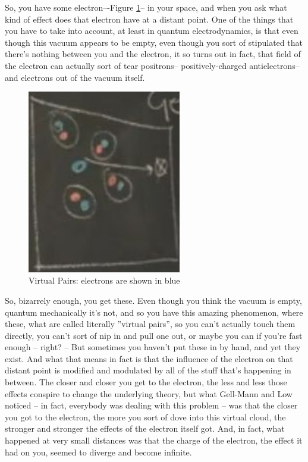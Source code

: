 \documentclass[]{article}
\begin{document}
So, you have some electron–-Figure \ref{fig:Virtual_Pairs}--
in your space, and when you ask what kind of effect does that electron have at a distant point.
One of the things that you have to take into account, at least in quantum electrodynamics, is that even though this vacuum appears to be empty, even though you sort of stipulated that there's nothing between you and the electron, it so turns out in fact, that field of the electron can actually sort of tear
positrons--
positively-charged antielectrons--and electrons out of the vacuum itself.
\begin{figure}[H]
	\begin{center}
		\caption{Virtual Pairs: electrons are shown in blue}\label{fig:Virtual_Pairs}
		\includegraphics[width=0.6\textwidth]{Virtual_Pairs}
	\end{center}
\end{figure}
So, bizarrely enough,
you get these.
Even though you think
the vacuum is empty,
quantum mechanically it's not,
and so you have
this amazing phenomenon,
where these, what are called
literally ''virtual pairs'',
so you can't actually touch them directly,
you can't sort of nip in
and pull one out,
or maybe you can
if you're fast enough – right? –
But sometimes you haven't
put these in by hand,
and yet they exist.
And what that means in fact
is that the influence
of the electron on that distant point
is modified and modulated
by all of the stuff
that's happening in between.
The closer and closer
you get to the electron,
the less and less those effects conspire
to change the underlying theory,
but what Gell-Mann and Low noticed –
in fact, everybody
was dealing with this problem –
was that the closer
you got to the electron,
the more you sort of dove
into this virtual cloud,
the stronger and stronger
the effects of the electron itself got.
And, in fact, what happened
at very small distances
was that the charge of the electron,
the effect it had on you,
seemed to diverge and become infinite.
\end{document}
